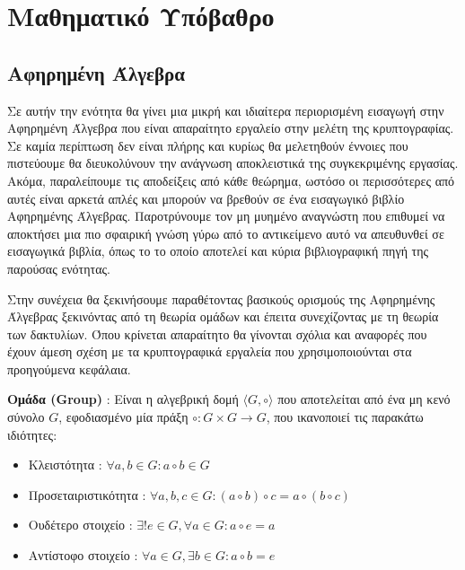 \section{Μαθηματικό Υπόβαθρο}
\label{section:math-backgorund}

\subsection{Αφηρημένη Άλγεβρα}

Σε αυτήν την ενότητα θα γίνει μια μικρή και ιδιαίτερα περιορισμένη εισαγωγή στην Αφηρημένη Άλγεβρα που είναι απαραίτητο εργαλείο στην μελέτη της κρυπτογραφίας. Σε καμία περίπτωση δεν είναι πλήρης και κυρίως θα μελετηθούν έννοιες που πιστεύουμε θα διευκολύνουν την ανάγνωση αποκλειστικά της συγκεκριμένης εργασίας. Ακόμα, παραλείπουμε τις αποδείξεις από κάθε θεώρημα, ωστόσο οι περισσότερες από αυτές είναι αρκετά απλές και μπορούν να βρεθούν σε ένα εισαγωγικό βιβλίο Αφηρημένης Άλγεβρας. Παροτρύνουμε τον μη μυημένο αναγνώστη που επιθυμεί να αποκτήσει μια πιο σφαιρική γνώση γύρω από το αντικείμενο αυτό να απευθυνθεί σε εισαγωγικά βιβλία, όπως το \cite{pinter2010book} το οποίο αποτελεί και κύρια βιβλιογραφική πηγή της παρούσας ενότητας.

Στην συνέχεια θα ξεκινήσουμε παραθέτοντας βασικούς ορισμούς της Αφηρημένης Άλγεβρας ξεκινόντας από τη θεωρία ομάδων και έπειτα συνεχίζοντας με τη θεωρία των δακτυλίων. Όπου κρίνεται απαραίτητο θα γίνονται σχόλια και αναφορές που έχουν άμεση σχέση με τα κρυπτογραφικά εργαλεία που χρησιμοποιούνται στα προηγούμενα κεφάλαια.

\begin{definition}
\textbf{Ομάδα (Group)} : Είναι η αλγεβρική δομή $\langle G, \circ \rangle$ που αποτελείται από ένα μη κενό σύνολο $G$, εφοδιασμένο μία πράξη $\circ : G \times G \rightarrow G$, που ικανοποιεί τις παρακάτω ιδιότητες:

\begin{itemize}
    \item Κλειστότητα : $\forall a,b \in G : a \circ b \in G$
    \item Προσεταιριστικότητα : $\forall a,b,c \in G : (a \circ b) \circ c = a \circ (b \circ c)$
    \item Ουδέτερο στοιχείο : $\exists! e \in G, \forall a \in G : a \circ e = a $
    \item Αντίστοφο στοιχείο : $\forall a \in G, \exists b \in G : a \circ b = e$
\end{itemize}
\end{definition}

